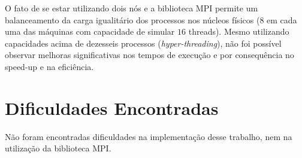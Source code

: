 \documentclass[11pt]{IEEEtran}
\begin{document}
	O fato de se estar utilizando dois nós e a biblioteca MPI permite um
	balanceamento da carga igualitário dos processos nos núcleos físicos ($8$ em
	cada uma das máquinas com capacidade de simular $16$ threads). Mesmo
	utilizando capacidades acima de dezesseis processos
	(\emph{hyper-threading}), não foi possível observar melhoras significativas
	nos tempos de execução e por consequência no speed-up e na eficiência.

\section{Dificuldades Encontradas}

	Não foram encontradas dificuldades na implementação desse trabalho, nem na
	utilização da biblioteca MPI\@.
\end{document}
